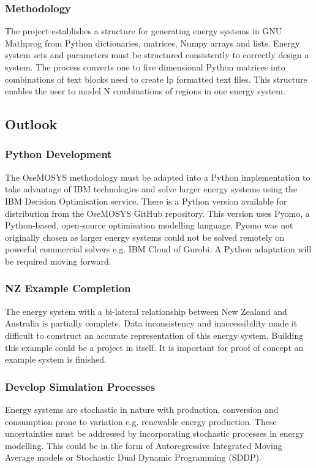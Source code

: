 \documentclass[12pt]{article}
\begin{document}
\subsubsection{Methodology}\label{KFM}
The project establishes a structure for generating energy systems in GNU Mathprog from Python dictionaries, matrices, Numpy arrays and lists.
Energy system sets and parameters must be structured consistently to correctly design a system.
The process converts one to five dimensional Python matrices into combinations of text blocks need to create lp formatted text files.
This structure enables the user to model N combinations of regions in one energy system.
\subsection{Outlook}\label{FW}
\subsubsection{Python Development}
The OseMOSYS methodology must be adapted into a Python implementation to take advantage of IBM technologies and solve larger energy systems using the IBM Decision Optimisation service.
There is a Python version available for distribution from the OseMOSYS GitHub repository.
This version uses Pyomo, a Python-based, open-source optimisation modelling language.
Pyomo was not originally chosen as larger energy systems could not be solved remotely on powerful commercial solvers e.g. IBM Cloud of Gurobi.
A Python adaptation will be required moving forward.
\subsubsection{NZ Example Completion} \label{FutureWork}
The energy system with a bi-lateral relationship between New Zealand and Australia is partially complete.
Data inconsistency and inaccessibility made it difficult to construct an accurate representation of this energy system.
Building this example could be a project in itself.
It is important for proof of concept an example system is finished.
\subsubsection{Develop Simulation Processes}
Energy systems are stochastic in nature with production, conversion and consumption prone to variation e.g. renewable energy production.
These uncertainties must be addressed by incorporating stochastic processes in energy modelling.
This could be in the form of Autoregressive Integrated Moving Average models or Stochastic Dual Dynamic Programming (SDDP).
\end{document}
